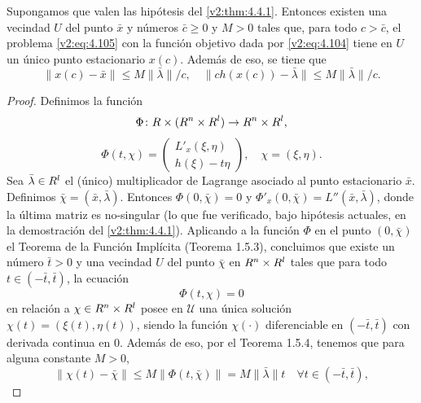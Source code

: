 \begin{theorem}\label{v2:thm:4.4.4}
    Supongamos que valen las hipótesis del \cref{v2:thm:4.4.1}.
    Entonces existen una vecindad $U$ del punto $\bar{x}$ y números $\bar{c} \ge 0$ y $M > 0$ tales que, para todo $c > \bar{c}$, el problema \eqref{v2:eq:4.105} con la función objetivo dada por \eqref{v2:eq:4.104} tiene en $U$ un único punto estacionario $x(c)$. Además de eso, se tiene que
    \begin{equation}
        \|x(c) - \bar{x}\| \le M\|\bar{\lambda}\|/c, \quad \|c h(x(c)) - \bar{\lambda}\| \le M\|\bar{\lambda}\|/c.
        \label{v2:eq:4.110}
    \end{equation}
\end{theorem}
\begin{proof}
    Definimos la función
    \[
        \Phi \colon R \times (R^n \times R^l) \to R^n \times R^l,
    \]
    \begin{equation}
        \Phi(t, \chi) = \begin{pmatrix} L'_x(\xi, \eta) \\ h(\xi) - t\eta \end{pmatrix}, \quad \chi = (\xi, \eta).
        \label{v2:eq:4.111}
    \end{equation}
    Sea $\bar{\lambda} \in R^l$ el (único) multiplicador de Lagrange asociado al punto estacionario $\bar{x}$. Definimos $\bar{\chi} = (\bar{x}, \bar{\lambda})$. Entonces $\Phi(0, \bar{\chi}) = 0$ y $\Phi'_x(0, \bar{\chi}) = L''(\bar{x}, \bar{\lambda})$, donde la última matriz es no-singular (lo que fue verificado, bajo hipótesis actuales, en la demostración del \cref{v2:thm:4.4.1}). Aplicando a la función $\Phi$ en el punto $(0, \bar{\chi})$ el Teorema de la Función Implícita (Teorema 1.5.3), concluimos que existe un número $\bar{t} > 0$ y una vecindad $U$ del punto $\bar{\chi}$ en $R^n \times R^l$ tales que para todo $t \in (-\bar{t}, \bar{t})$, la ecuación
    \begin{equation}
        \Phi(t, \chi) = 0
        \label{v2:eq:4.112}
    \end{equation}
    en relación a $\chi \in R^n \times R^l$ posee en $\mathcal{U}$ una única solución $\chi(t) = (\xi(t), \eta(t))$, siendo la función $\chi(\cdot)$ diferenciable en $(-\bar{t}, \bar{t})$ con derivada continua en $0$. Además de eso, por el Teorema 1.5.4, tenemos que para alguna constante $M > 0$,
    \begin{equation}
        \|\chi(t) - \bar{\chi}\| \le M\|\Phi(t, \bar{\chi})\| = M\|\bar{\lambda}\|t \quad \forall t \in (-\bar{t}, \bar{t}),

\end{equation}
\end{proof}
